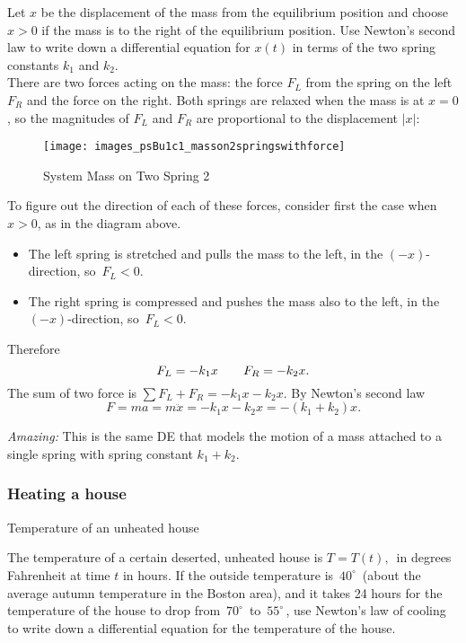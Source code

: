 Let $x$ be the displacement of the mass from the equilibrium position
and choose $x>0$ if the mass is to the right of the equilibrium position.
Use Newton's second law to write down a differential equation for $x(t)$
in terms of the two spring constants $k_ 1$ and $k_ 2$. \\

There are two forces acting on the mass: the force $F_ L$
from the spring on the left $F_ R$ and the force on the right.
Both springs are relaxed when the mass is at $x=0$, so the magnitudes of $F_ L$ and $F_ R$ are proportional to the displacement $|x|$:

\begin{figure}[ht!]
  \centering
  \texttt{[image: images\_psBu1c1\_masson2springswithforce]}
  \caption{System Mass on Two Spring 2}
\end{figure}

To figure out the direction of each of these forces,
consider first the case when $x>0$, as in the diagram above.

\begin{itemize}
\item The left spring is stretched and pulls the mass to the left, in the $(-x)$-direction,
  so $\, F_ L<0$.
\item The right spring is compressed and pushes the mass also to the left,
  in the $(-x)$-direction, so $\, F_ L<0$. 
\end{itemize}

Therefore
\begin{equation*}
  \displaystyle  \displaystyle F_ L=-k_1 x \qquad \displaystyle  F_ R=-k_2 x.
\end{equation*}
The sum of two force is $\sum F_L + F_R = -k_ 1 x - k_ 2 x$.
By Newton's second law
\begin{equation*}
  F = ma = m \ddot{x} = -k_ 1 x - k_ 2 x = -(k _1 + k _2)x . 
\end{equation*}

\emph{Amazing: } This is the same DE that models the motion of a mass attached
to a single spring with spring constant $k_1 + k_ 2$.
\clearpage

\subsubsection{Heating a house}

\begin{homework}
  Temperature of an unheated house
\end{homework}

The temperature of a certain deserted,
unheated house is $T=T(t),\,$ in degrees Fahrenheit at time $t$ in hours.
If the outside temperature is $\, 40 ^{\circ }\,$ (about the average autumn temperature in the Boston area),
and it takes 24 hours for the temperature of the house to drop from $\, 70 ^{\circ }\,$ to $\, 55 ^{\circ }\,$,
use Newton's law of cooling to write down a differential equation for the temperature of the house.\\



\clearpage

